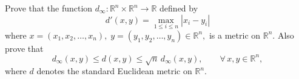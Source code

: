 \documentclass[12pt, a4paper]{article}
\begin{document}
\clearpage

\begin{theorem}
Prove that the function $d_{\infty} : \mathbb{R}^n \times \mathbb{R}^n \to \mathbb{R}$
defined by
\[
d'(x,y)=\max_{1\le i\le n}|x_i-y_i|\]
where
\(x=(x_1,x_2,\dots,x_n),\;
y=(y_1,y_2,\dots,y_n)\in\mathbb{R}^n,
\)
is a metric on $\mathbb{R}^n$. Also prove that
\[
d_{\infty}(x,y)\le d(x,y)\le \sqrt{n}\,d_{\infty}(x,y),
\qquad \forall\, x,y\in\mathbb{R}^n,
\]
where $d$ denotes the standard Euclidean metric on $\mathbb{R}^n$.
\end{theorem}

\clearpage

\EndPage
\end{document}
